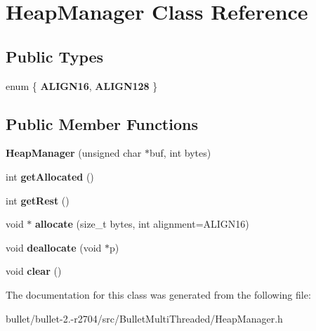 \hypertarget{class_heap_manager}{\section{Heap\+Manager Class Reference}
\label{class_heap_manager}
}
\subsection*{Public Types}
\begin{DoxyCompactItemize}
\item 
\hypertarget{class_heap_manager_a0a9626070bba7aac50b758e4327fe778}{enum \{ {\bfseries A\+L\+I\+G\+N16}, 
{\bfseries A\+L\+I\+G\+N128}
 \}}\label{class_heap_manager_a0a9626070bba7aac50b758e4327fe778}

\end{DoxyCompactItemize}
\subsection*{Public Member Functions}
\begin{DoxyCompactItemize}
\item 
\hypertarget{class_heap_manager_a30a64630fa0e9d32080fcbdb9f243b75}{{\bfseries Heap\+Manager} (unsigned char $\ast$buf, int bytes)}\label{class_heap_manager_a30a64630fa0e9d32080fcbdb9f243b75}

\item 
\hypertarget{class_heap_manager_a6634102da3073f1b742a15171ace93d3}{int {\bfseries get\+Allocated} ()}\label{class_heap_manager_a6634102da3073f1b742a15171ace93d3}

\item 
\hypertarget{class_heap_manager_ab1c1762e6a5baedf2ad870b85a8b958e}{int {\bfseries get\+Rest} ()}\label{class_heap_manager_ab1c1762e6a5baedf2ad870b85a8b958e}

\item 
\hypertarget{class_heap_manager_a20109bbc392db6d15b355a5ceb88166f}{void $\ast$ {\bfseries allocate} (size\+\_\+t bytes, int alignment=A\+L\+I\+G\+N16)}\label{class_heap_manager_a20109bbc392db6d15b355a5ceb88166f}

\item 
\hypertarget{class_heap_manager_a1ba5a00c9596ef5eedbaf984cb73cb6a}{void {\bfseries deallocate} (void $\ast$p)}\label{class_heap_manager_a1ba5a00c9596ef5eedbaf984cb73cb6a}

\item 
\hypertarget{class_heap_manager_add0c480cf7618976a40bf6957cd2a70a}{void {\bfseries clear} ()}\label{class_heap_manager_add0c480cf7618976a40bf6957cd2a70a}

\end{DoxyCompactItemize}


The documentation for this class was generated from the following file\+:\begin{DoxyCompactItemize}
\item 
bullet/bullet-\/2.-\/r2704/src/\+Bullet\+Multi\+Threaded/Heap\+Manager.\+h\end{DoxyCompactItemize}
